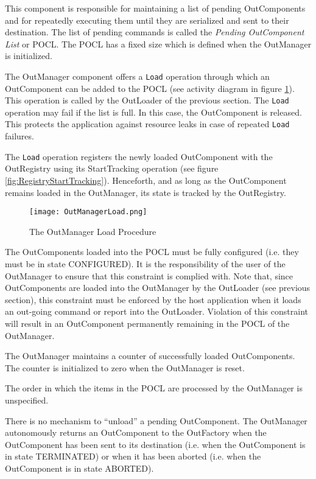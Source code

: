 This component is responsible for maintaining a list of pending OutComponents and for repeatedly executing them until they are serialized and sent to their destination.
The list of pending commands is called the \textit{Pending OutComponent List} or POCL. The POCL has a fixed size which is defined when the OutManager is initialized. 

The OutManager component offers a \texttt{Load} operation through which an OutComponent can be added to the POCL (see activity diagram in figure \ref{fig:OutManagerLoad}). This operation is called by the OutLoader of the previous section. The \texttt{Load} operation may fail if the list is full. In this case, the OutComponent is released. This protects the application against resource leaks in case of repeated \texttt{Load} failures.

The \texttt{Load} operation registers the newly loaded OutComponent with the OutRegistry using its StartTracking operation (see figure \ref{fig:RegistryStartTracking}). Henceforth, and as long as the OutComponent remains loaded in the OutManager, its state is tracked by the OutRegistry. 

\begin{figure}[h]
 \centering
 \texttt{[image: OutManagerLoad.png]}
 \caption{The OutManager Load Procedure}
 \label{fig:OutManagerLoad}
\end{figure}

The OutComponents loaded into the POCL must be fully configured (i.e. they must be in state CONFIGURED). It is the responsibility of the user of the OutManager to ensure that this constraint is complied with. Note that, since OutComponents are loaded into the OutManager by the OutLoader (see previous section), this constraint must be enforced by the host application when it loads an out-going command or report into the OutLoader. Violation of this constraint will result in an OutComponent permanently remaining in the POCL of the OutManager.

The OutManager maintains a counter of successfully loaded OutComponents. The counter is initialized to zero when the OutManager is reset.

The order in which the items in the POCL are processed by the OutManager is unspecified.

There is no mechanism to “unload” a pending OutComponent. The OutManager autonomously returns an OutComponent to the OutFactory when the OutComponent has been sent to its destination (i.e. when the OutComponent is in state TERMINATED) or when it has been aborted (i.e. when the OutComponent is in state ABORTED). 

